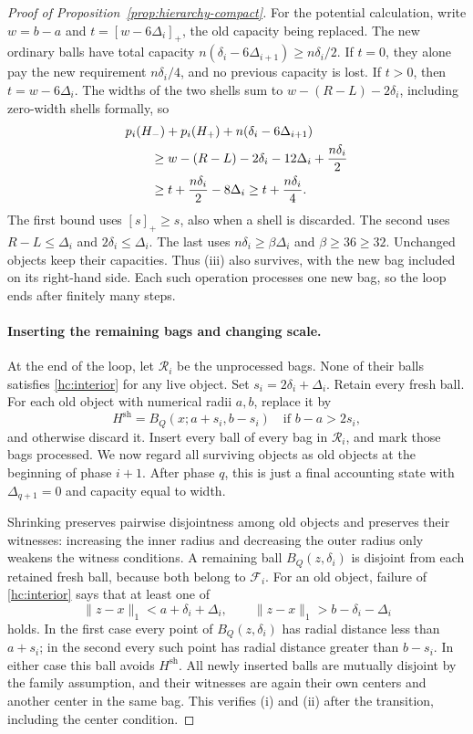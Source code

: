 \begin{proof}[Proof of Proposition~\ref{prop:hierarchy-compact}]
For the potential calculation, write \(w=b-a\) and
\(t=[w-6\Delta_i]_+\), the old capacity being replaced.  The new
ordinary balls have total capacity
\(n(\delta_i-6\Delta_{i+1})\ge n\delta_i/2\).
If \(t=0\), they alone pay the new requirement \(n\delta_i/4\),
and no previous capacity is lost.  If \(t>0\), then
\(t=w-6\Delta_i\).  The widths of the two shells sum to
\(w-(R-L)-2\delta_i\), including zero-width shells formally, so
\begin{align}
\label{hc:split-capacity}
 &p_i(H_-)+p_i(H_+)+n(\delta_i-6\Delta_{i+1})\notag\\
 &\qquad\ge w-(R-L)-2\delta_i-12\Delta_i
              +\frac{n\delta_i}{2}\notag\\
 &\qquad\ge t+\frac{n\delta_i}{2}-8\Delta_i
 \ge t+\frac{n\delta_i}{4}.
\end{align}
The first bound uses \([s]_+\ge s\), also when a shell is discarded.
The second uses \(R-L\le\Delta_i\) and
\(2\delta_i\le\Delta_i\).  The last uses
\(n\delta_i\ge \beta\Delta_i\) and \(\beta\ge36\ge32\).
Unchanged objects keep their capacities.  Thus (iii) also survives,
with the new bag included on its right-hand side.  Each such operation
processes one new bag, so the loop ends after finitely many steps.

\paragraph{Inserting the remaining bags and changing scale.}
At the end of the loop, let \(\mathcal R_i\) be the unprocessed bags.
None of their balls satisfies \eqref{hc:interior} for any live object.
Set
\(s_i=2\delta_i+\Delta_i\).
Retain every fresh ball.  For each old object with numerical radii
\(a,b\), replace it by
\begin{equation}
\label{hc:shrink}
 H^{\mathrm{sh}}=B_Q(x;a+s_i,b-s_i)
 \quad\text{if }b-a>2s_i,
\end{equation}
and otherwise discard it.  Insert every ball of every bag in
\(\mathcal R_i\), and mark those bags processed.  We now regard all
surviving objects as old objects at the beginning of phase \(i+1\).
After phase \(q\), this is just a final accounting state with
\(\Delta_{q+1}=0\) and capacity equal to width.

Shrinking preserves pairwise disjointness among old objects and
preserves their witnesses: increasing the inner radius and decreasing
the outer radius only weakens the witness conditions.  A remaining
ball \(B_Q(z,\delta_i)\) is disjoint from each retained fresh ball,
because both belong to \(\mathcal F_i\).  For an old object, failure
of \eqref{hc:interior} says that at least one of
\[
 \|z-x\|_1<a+\delta_i+\Delta_i,
 \qquad
 \|z-x\|_1>b-\delta_i-\Delta_i
\]
holds.  In the first case every point of \(B_Q(z,\delta_i)\) has
radial distance less than \(a+s_i\); in the second every such point
has radial distance greater than \(b-s_i\).  In either case this ball
avoids \(H^{\mathrm{sh}}\).  All newly inserted balls are mutually
disjoint by the family assumption, and their witnesses are again
their own centers and another center in the same bag.  This verifies
(i) and (ii) after the transition, including the center condition.


\end{proof}
